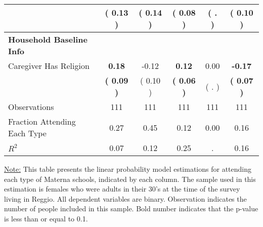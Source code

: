 \begin{table}[H]
{\begin{tabular}{lccccc}
\quad  & (     0.13 ) & (     0.14 )  & (     0.08 )  & (        . ) & (     0.10 ) \\
\midrule
\textbf{Household Baseline Info} \\
\quad Caregiver Has Religion & \textbf{     0.18} &     -0.12 & \textbf{     0.12} &      0.00 & \textbf{    -0.17} \\
\quad  & \textbf{(     0.09 )} & (     0.10 )  & \textbf{(     0.06 )}  & (        . ) & \textbf{(     0.07 )} \\
\midrule
Observations & 111 & 111 & 111 & 111 & 111 \\
Fraction Attending Each Type &      0.27 &      0.45 &      0.12 &      0.00 &      0.16 \\
\midrule
$ R^2$ &      0.07 &      0.12 &      0.25 &         . &      0.16 \\
\bottomrule
\end{tabular}}
\end{table}
\begin{footnotesize}
\noindent\underline{Note:} This table presents the linear probability model estimations for attending each type of Materna schools, indicated by each column. The sample used in this estimation is females who were adults in their 30's at the time of the survey living in Reggio. All dependent variables are binary. Observation indicates the number of people included in this sample. Bold number indicates that the p-value is less than or equal to 0.1.
\end{footnotesize}
